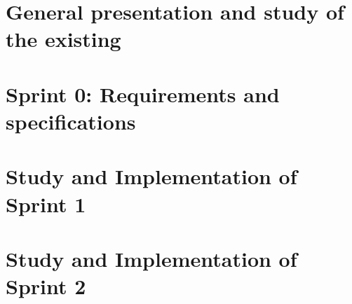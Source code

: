 \documentclass{polypfe}
\begin{document}


%



\newpage


\tableofcontents

\newpage

\listoffigures

\newpage

\listoftables

\newpage



\newpage





\chapter{General presentation and study of the existing}
\clearpage







\chapter{Sprint 0: Requirements and specifications}
\clearpage






%


\chapter{Study and Implementation of Sprint 1}
\clearpage








\chapter{Study and Implementation of Sprint 2}
\clearpage
\end{document}
